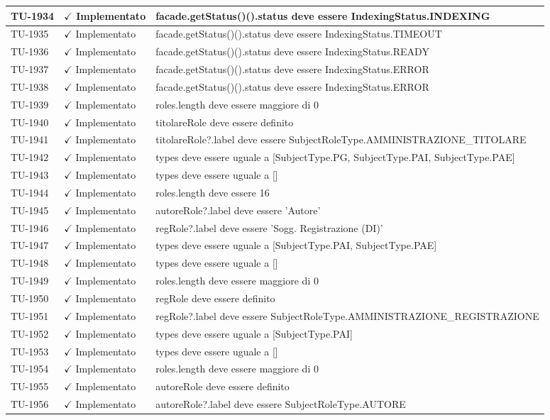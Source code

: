 ﻿\documentclass[a4paper,12pt]{article}
\newcommand{\ok}{\textcolor{green!60!black}{$\checkmark$ Implementato}}
\begin{document}
\begin{longtable}{|p{2cm}|p{3.5cm}|p{9.5cm}|}
\hline
TU-1934 & \ok & facade.getStatus()().status deve essere IndexingStatus.INDEXING \\
\hline
TU-1935 & \ok & facade.getStatus()().status deve essere IndexingStatus.TIMEOUT \\
\hline
TU-1936 & \ok & facade.getStatus()().status deve essere IndexingStatus.READY \\
\hline
TU-1937 & \ok & facade.getStatus()().status deve essere IndexingStatus.ERROR \\
\hline
TU-1938 & \ok & facade.getStatus()().status deve essere IndexingStatus.ERROR \\
\hline
TU-1939 & \ok & roles.length deve essere maggiore di 0 \\
\hline
TU-1940 & \ok & titolareRole deve essere definito \\
\hline
TU-1941 & \ok & titolareRole?.label deve essere SubjectRoleType.AMMINISTRAZIONE\_TITOLARE \\
\hline
TU-1942 & \ok & types deve essere uguale a [SubjectType.PG, SubjectType.PAI, SubjectType.PAE] \\
\hline
TU-1943 & \ok & types deve essere uguale a [] \\
\hline
TU-1944 & \ok & roles.length deve essere 16 \\
\hline
TU-1945 & \ok & autoreRole?.label deve essere 'Autore' \\
\hline
TU-1946 & \ok & regRole?.label deve essere 'Sogg. Registrazione (DI)' \\
\hline
TU-1947 & \ok & types deve essere uguale a [SubjectType.PAI, SubjectType.PAE] \\
\hline
TU-1948 & \ok & types deve essere uguale a [] \\
\hline
TU-1949 & \ok & roles.length deve essere maggiore di 0 \\
\hline
TU-1950 & \ok & regRole deve essere definito \\
\hline
TU-1951 & \ok & regRole?.label deve essere SubjectRoleType.AMMINISTRAZIONE\_REGISTRAZIONE \\
\hline
TU-1952 & \ok & types deve essere uguale a [SubjectType.PAI] \\
\hline
TU-1953 & \ok & types deve essere uguale a [] \\
\hline
TU-1954 & \ok & roles.length deve essere maggiore di 0 \\
\hline
TU-1955 & \ok & autoreRole deve essere definito \\
\hline
TU-1956 & \ok & autoreRole?.label deve essere SubjectRoleType.AUTORE \\

\end{longtable}
\end{document}
